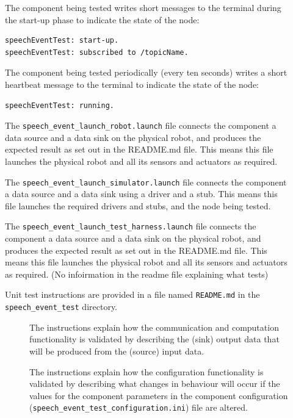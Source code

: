 \documentclass{CSSRforAfrica}
\newcommand{\checkboxChecked}{\fbox{\ding{51}}} %
\newcommand{\checkboxDashed}{\fbox{--}}         %
\begin{document}
\begin{description}
\item[\checkboxChecked]  The component being tested writes short messages to the terminal during the start-up phase to indicate the state of the node:
{\small 
\begin{verbatim}
speechEventTest: start-up.
speechEventTest: subscribed to /topicName.
\end{verbatim}}

\item[\checkboxChecked]   The component being tested periodically (every ten seconds) writes a short heartbeat message to the terminal to indicate the state of the node:
{\small 
\begin{verbatim}
speechEventTest: running.
\end{verbatim}}

\item[\checkboxChecked] The {\small \verb+speech_event_launch_robot.launch+} file connects the component a data source and a data sink on the physical robot, and produces the expected result as set out in the README.md file. This means this file launches the physical robot and all its sensors and actuators as required.

\item[\checkboxDashed]   The {\small \verb+speech_event_launch_simulator.launch+} file connects the component a data source and a data sink using a driver and a stub. This means this file launches the required drivers and stubs, and the node being tested.

\item[\checkboxChecked]   The {\small \verb+speech_event_launch_test_harness.launch+} file connects the component a data source and a data sink on the physical robot, and produces the expected result as set out in the README.md file. This means this file launches the physical robot and all its sensors and actuators as required. (No infoirmation in the readme file explaining what tests)

\item[\checkboxChecked] Unit test instructions are provided in a file named {\small \verb+README.md+} in the  {\small \verb+speech_event_test+} directory. 


\begin{description}

\item[\checkboxChecked] The instructions explain how the communication and computation functionality is validated by describing the (sink) output data that will be produced from the (source) input data.  

\item[\checkboxChecked] The instructions explain how the configuration functionality is validated by describing what changes in behaviour will occur if the values for the component parameters in the component configuration ({\small \verb+speech_event_test_configuration.ini+}) file are altered.

\end{description}
\end{description}
\newpage
\end{document}
